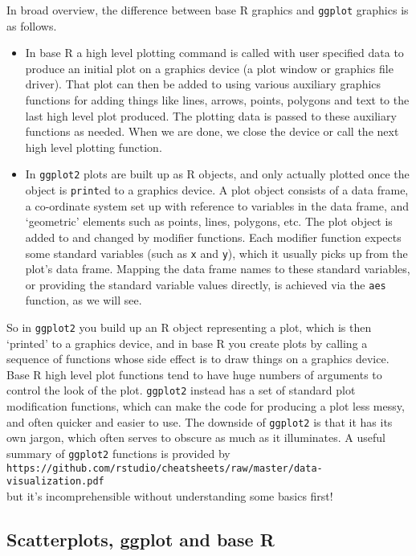 \documentclass[10pt] {article}
\theoremstyle{definition}
\begin{document}
In broad overview, the difference between base R graphics and {\tt ggplot} graphics is as follows.
\begin{itemize}
\item In base R a high level plotting command is called with user specified data to produce an initial plot on a graphics device (a plot window or graphics file driver). That plot can then be added to using various auxiliary graphics functions for adding things like lines, arrows, points, polygons and text to the last high level plot produced. The plotting data is passed to these auxiliary functions as needed.  When we are done, we close the device or call the next high level plotting function. 
\item In {\tt ggplot2} plots are built up as R objects, and only actually plotted once the object is {\tt print}ed to a graphics device. A plot object consists of a data frame, a co-ordinate system set up with reference to variables in the data frame, and `geometric' elements such as points, lines, polygons, etc. The plot object is added to and changed by modifier functions. Each modifier function expects some standard variables (such as {\tt x} and {\tt y}), which it usually picks up from the plot's data frame. Mapping the data frame names to these standard variables, or providing the standard variable values directly, is achieved via the {\tt aes} function, as we will see.     
\end{itemize}
So in {\tt ggplot2} you build up an R object representing a plot, which is then `printed' to a graphics device, and in base R you create plots by calling a sequence of functions whose side effect is to draw things on a graphics device. Base R high level plot functions tend to have huge numbers of arguments to control the look of the plot. {\tt ggplot2} instead has a set of standard plot modification functions, which can make the code for producing a plot less messy, and often quicker and easier to use. The downside of {\tt ggplot2} is that it has its own jargon, which often serves to obscure as much as it illuminates. A useful summary of {\tt ggplot2} functions is provided by\\ 
\verb+https://github.com/rstudio/cheatsheets/raw/master/data-visualization.pdf+\\
but it's incomprehensible without understanding some basics first!

\subsection{Scatterplots, ggplot and base R} 
\end{document}
